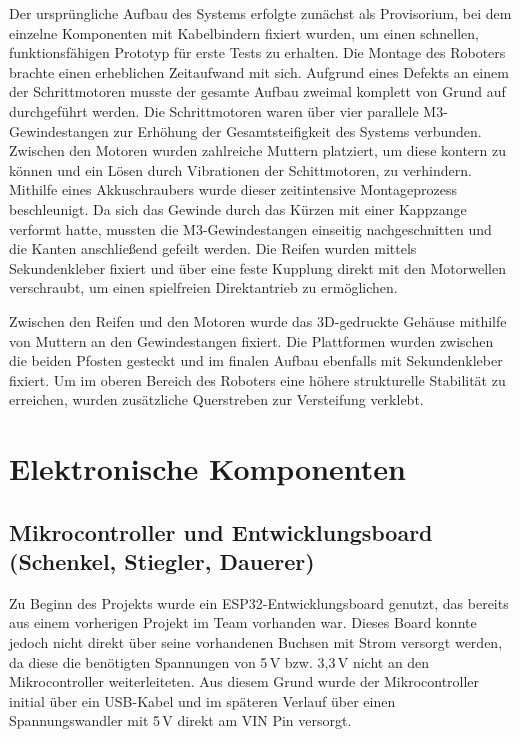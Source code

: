 \documentclass[fontsize=12pt,
parskip=half,	%
department=FakM,  %
logostyle=flat,
twoside, %
DIV=15,BCOR=10mm, %
]{OTHRreprt}
\begin{document}
Der ursprüngliche Aufbau des Systems erfolgte zunächst als Pro\-vi\-so\-ri\-um, bei dem 
einzelne Komponenten mit Kabelbindern fixiert wurden, um einen schnellen, 
funk\-tions\-fä\-hi\-gen Pro\-to\-typ für erste Tests zu erhalten.
Die Montage des Roboters brachte einen erheblichen Zeitaufwand mit sich. Aufgrund eines Defekts an einem der Schrittmotoren musste der gesamte Aufbau zweimal komplett von Grund auf durchgeführt werden. 
Die Schrittmotoren waren über vier parallele M3-Gewindestangen zur Erhöhung der Ge\-samt\-stei\-fig\-keit des Systems verbunden. Zwischen den Motoren wurden zahlreiche Muttern platziert, um diese kontern zu können und ein Lösen durch Vibrationen der Schittmotoren, zu verhindern. 
Mithilfe eines Akkuschraubers wurde dieser zeitintensive Montageprozess beschleunigt. Da sich das Gewinde durch das Kürzen mit einer Kappzange verformt hatte, mussten die M3-Gewindestangen einseitig nachgeschnitten und die Kanten anschließend gefeilt werden.
Die Reifen wurden mittels Sekundenkleber fixiert und über eine feste Kupplung direkt mit den Motorwellen verschraubt, um einen spielfreien Direktantrieb zu ermöglichen.

Zwischen den Reifen und den Motoren wurde das 3D-gedruckte Gehäuse mithilfe von Muttern an den Gewindestangen fixiert. Die Plattformen wurden zwischen die beiden Pfosten gesteckt und im finalen Aufbau ebenfalls mit Sekundenkleber fixiert. Um im oberen Bereich des Roboters eine höhere strukturelle Stabilität zu erreichen, wurden zusätzliche Querstreben zur Versteifung verklebt.

\section{Elektronische Komponenten}
\label{sec:elektronische_komponenten}

\subsection{Mikrocontroller und Entwicklungsboard (Schenkel, Stiegler, Dauerer)}
\label{subsec:esp32_komponente}

Zu Beginn des Projekts wurde ein ESP32-Entwicklungsboard genutzt, das bereits aus einem vorherigen Projekt im Team vorhanden war. 
Dieses Board konnte jedoch nicht direkt über seine vorhandenen Buchsen mit Strom versorgt werden, da diese die benötigten Spannungen von 5\,V bzw. 3{,}3\,V nicht an den Mikrocontroller weiterleiteten. 
Aus diesem Grund wurde der Mikrocontroller initial über ein USB-Kabel und im späteren Verlauf über einen Spannungswandler mit 5\,V direkt am VIN Pin versorgt.
\end{document}
